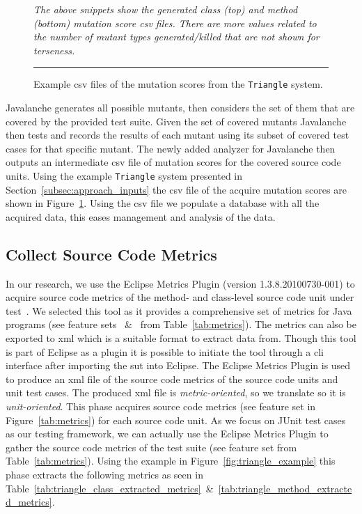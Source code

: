 \begin{figure}[b]
  \centering
  
  
  \caption{Example \gls{csv} files of the mutation scores from the \texttt{Triangle} system.}
  \vspace{1mm}
  \footnotesize{\emph{The above snippets show the generated class (top) and method (bottom) mutation score \gls{csv} files. There are more values related to the number of mutant types generated/killed that are not shown for terseness.}}
  \vspace{2mm}
  \hrule
  \label{fig:triangle_mutation_scores}
\end{figure}

Javalanche generates all possible mutants, then considers the set of them that are covered by the provided test suite. Given the set of covered mutants Javalanche then tests and records the results of each mutant using its subset of covered test cases for that specific mutant. The newly added analyzer for Javalanche then outputs an intermediate \gls{csv} file of mutation scores for the covered source code units. Using the example \texttt{Triangle} system presented in Section~\ref{subsec:approach_inputs} the \gls{csv} file of the acquire mutation scores are shown in Figure~\ref{fig:triangle_mutation_scores}. Using the \gls{csv} file we populate a database with all the acquired data, this eases management and analysis of the data.


\subsection{Collect Source Code Metrics}
\label{subsec:approach_collect_source_metrics}
In our research, we use the Eclipse Metrics Plugin (version 1.3.8.20100730-001) to acquire source code metrics of the method- and class-level source code unit under test~\cite{Metrics}. We selected this tool as it provides a comprehensive set of metrics for Java programs (see feature sets ~\&~ from Table~\ref{tab:metrics}). The metrics can also be exported to \gls{xml} which is a suitable format to extract data from. Though this tool is part of Eclipse as a plugin it is possible to initiate the tool through a \gls{cli} interface after importing the \gls{sut} into Eclipse. The Eclipse Metrics Plugin is used to produce an \gls{xml} file of the source code metrics of the source code units and unit test cases. The produced \gls{xml} file is \emph{metric-oriented}, so we translate so it is \emph{unit-oriented}. This phase acquires source code metrics (see feature set  in Figure~\ref{tab:metrics}) for each source code unit. As we focus on JUnit test cases as our testing framework, we can actually use the Eclipse Metrics Plugin to gather the source code metrics of the test suite (see feature set  from Table~\ref{tab:metrics}). Using the example in Figure~\ref{fig:triangle_example} this phase extracts the following metrics as seen in Table~\ref{tab:triangle_class_extracted_metrics}~\&~\ref{tab:triangle_method_extracted_metrics}.

